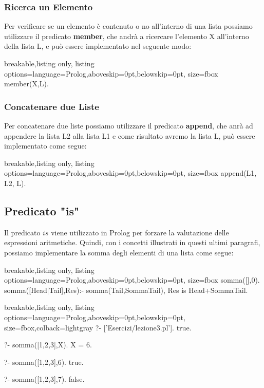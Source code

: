 \subsubsection{Ricerca un Elemento}
Per verificare se un elemento è contenuto o no all'interno di una lista possiamo utilizzare il predicato \textbf{member}, che andrà a ricercare l'elemento X all'interno della lista L, e può essere implementato nel seguente modo:
\begin{tcblisting}{breakable,listing only, listing options={language=Prolog,aboveskip=0pt,belowskip=0pt}, size=fbox}
member(X,L).
\end{tcblisting}

\subsubsection{Concatenare due Liste}
Per concatenare due liste possiamo utilizzare il predicato \textbf{append}, che anrà ad appendere la lista L2 alla lista L1 e come risultato avremo la lista L, può essere implementato come segue:
\begin{tcblisting}{breakable,listing only, listing options={language=Prolog,aboveskip=0pt,belowskip=0pt}, size=fbox}
append(L1, L2, L).
\end{tcblisting}

\subsection{Predicato "is"}
Il predicato $is$ viene utilizzato in Prolog per forzare la valutazione delle espressioni aritmetiche. Quindi, con i concetti illustrati in questi ultimi paragrafi, possiamo implementare la somma degli elementi di una lista come segue:
\begin{tcblisting}{breakable,listing only, listing options={language=Prolog,aboveskip=0pt,belowskip=0pt}, size=fbox}
somma([],0).
somma([Head|Tail],Res):-
    somma(Tail,SommaTail),
    Res is Head+SommaTail.
\end{tcblisting}
\begin{tcblisting}{breakable,listing only, 
    listing options={language=Prolog,aboveskip=0pt,belowskip=0pt}, size=fbox,colback=lightgray}
?- ['Esercizi/lezione3.pl'].
true.

?- somma([1,2,3],X).
X = 6.

?- somma([1,2,3],6).
true.

?- somma([1,2,3],7).
false.
\end{tcblisting}
